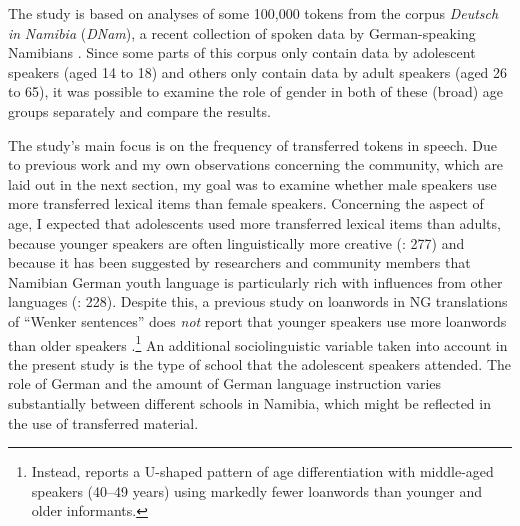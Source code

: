 \documentclass[output=paper]{langsci/langscibook}
\begin{document}
The study is based on analyses of some 100,000 tokens from the corpus \textit{Deutsch} \textit{in} \textit{Namibia} (\textit{DNam}), a recent collection of spoken data by German-speaking Namibians \citep{zimmer_korpus_2020}. Since some parts of this corpus only contain data by adolescent speakers (aged 14 to 18) and others only contain data by adult speakers (aged 26 to 65), it was possible to examine the role of gender in both of these (broad) age groups separately and compare the results.

The study’s main focus is on the frequency of transferred tokens in speech. Due to previous work and my own observations concerning the community, which are laid out in the next section, my goal was to examine whether male speakers use more transferred lexical items than female speakers. Concerning the aspect of age, I expected that adolescents used more transferred lexical items than adults, because younger speakers are often linguistically more creative (\citealt{wiese_deutsch_2014}: 277) and because it has been suggested by researchers and community members that Namibian German youth language is particularly rich with influences from other languages (\citealt{kellermeier-rehbein_sprache_2016}: 228). Despite this, a previous study on loanwords in NG translations of “Wenker sentences” does \textit{not} report that younger speakers use more loanwords than older speakers \citep{zimmer_linguisticvar_toappear}.\footnote{Instead, \citet{zimmer_linguisticvar_toappear} reports a U-shaped pattern of age differentiation with middle-aged speakers (40--49 years) using markedly fewer loanwords than younger and older informants.} An additional sociolinguistic variable taken into account in the present study is the type of school that the adolescent speakers attended. The role of German and the amount of German language instruction varies substantially between different schools in Namibia, which might be reflected in the use of transferred material.
\end{document}
